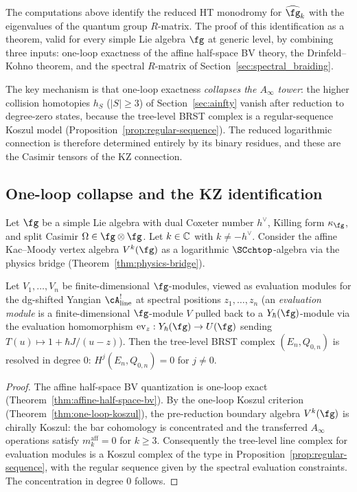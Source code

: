 The computations above identify the reduced HT monodromy for $\widehat{\fg}_k$ with the eigenvalues of the quantum group $R$-matrix. The proof of this identification as a theorem, valid for every simple Lie algebra $\fg$ at generic level, by combining three inputs: one-loop exactness of the affine half-space BV theory, the Drinfeld--Kohno theorem, and the spectral $R$-matrix of Section~\ref{sec:spectral_braiding}.

The key mechanism is that one-loop exactness \emph{collapses the $A_\infty$ tower}: the higher collision homotopies $h_S$ ($|S| \geq 3$) of Section~\ref{sec:ainfty} vanish after reduction to degree-zero states, because the tree-level BRST complex is a regular-sequence Koszul model (Proposition~\ref{prop:regular-sequence}). The reduced logarithmic connection is therefore determined entirely by its binary residues, and these are the Casimir tensors of the KZ connection.

\subsection{One-loop collapse and the KZ identification}

Let $\fg$ be a simple Lie algebra with dual Coxeter number $h^\vee$, Killing form $\kappa_\fg$, and split Casimir $\Omega \in \fg \otimes \fg$. Let $k \in \mathbb C$ with $k \neq -h^\vee$. Consider the affine Kac--Moody vertex algebra $V^k(\fg)$ as a logarithmic $\SCchtop$-algebra via the physics bridge (Theorem~\ref{thm:physics-bridge}).

\begin{proposition}
\label{prop:affine-resolved}
Let $V_1, \dots, V_n$ be finite-dimensional $\fg$-modules, viewed as evaluation modules for the dg-shifted Yangian $\cA^!_{\mathrm{line}}$ at spectral positions $z_1, \dots, z_n$ (an \emph{evaluation module} is a finite-dimensional $\fg$-module $V$ pulled back to a $Y_\hbar(\fg)$-module via the evaluation homomorphism $\mathrm{ev}_z: Y_\hbar(\fg) \to U(\fg)$ sending $T(u) \mapsto 1 + \hbar J/(u-z)$). Then the tree-level BRST complex $(E_n, Q_{0,n})$ is resolved in degree $0$: $H^j(E_n, Q_{0,n}) = 0$ for $j \neq 0$.
\end{proposition}

\begin{proof}
The affine half-space BV quantization is one-loop exact (Theorem~\ref{thm:affine-half-space-bv}). By the one-loop Koszul criterion (Theorem~\ref{thm:one-loop-koszul}), the pre-reduction boundary algebra $V^k(\fg)$ is chirally Koszul: the bar cohomology is concentrated and the transferred $A_\infty$ operations satisfy $m_k^{\mathrm{aff}} = 0$ for $k \geq 3$. Consequently the tree-level line complex for evaluation modules is a Koszul complex of the type in Proposition~\ref{prop:regular-sequence}, with the regular sequence given by the spectral evaluation constraints. The concentration in degree $0$ follows.
\end{proof}

